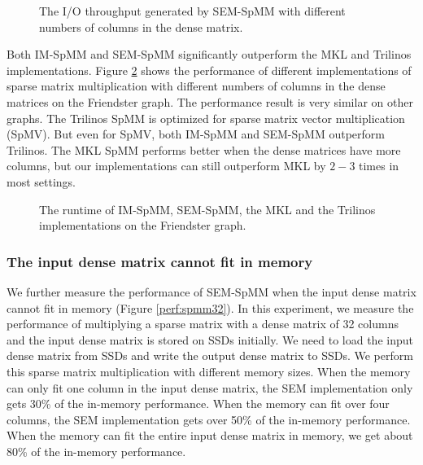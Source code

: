 \begin{figure}
	\begin{center}
		\footnotesize
		
		\caption{The I/O throughput generated by SEM-SpMM with different numbers of
		columns in the dense matrix.}
		\label{perf:spmm_IO}
	\end{center}
\end{figure}

Both IM-SpMM and SEM-SpMM significantly outperform the MKL and Trilinos implementations.
Figure \ref{perf:spmm} shows the performance of different implementations of
sparse matrix multiplication with different numbers of columns in the dense
matrices on the Friendster graph. The performance result is very similar
on other graphs. The Trilinos SpMM is optimized for sparse matrix vector
multiplication (SpMV). But even for SpMV, both IM-SpMM and SEM-SpMM outperform
Trilinos. The MKL SpMM performs better when the dense matrices have more columns,
but our implementations can still outperform MKL by $2-3$ times in most settings.

\begin{figure}
	\begin{center}
		\footnotesize
		
		\caption{The runtime of IM-SpMM, SEM-SpMM, the MKL and the Trilinos
			implementations on the Friendster graph.}
		\label{perf:spmm}
	\end{center}
\end{figure}

\subsubsection{The input dense matrix cannot fit in memory}

We further measure the performance of SEM-SpMM when the input dense matrix
cannot fit in memory (Figure \ref{perf:spmm32}). In this experiment, we
measure the performance of multiplying a sparse matrix with a dense matrix
of 32 columns and the input dense matrix is stored on SSDs initially.
We need to load the input dense matrix from SSDs and write the output dense
matrix to SSDs. 
We perform this sparse matrix multiplication with different memory sizes.
When the memory can only fit one column in the input dense matrix, the SEM
implementation only gets 30\% of the in-memory performance. When the memory
can fit over four columns, the SEM implementation gets over 50\% of
the in-memory performance. When the memory can fit the entire input dense
matrix in memory, we get about 80\% of the in-memory performance.

